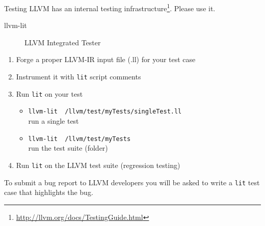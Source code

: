 \begin{frame}{Testing}
LLVM has an internal testing infrastructure\footnote{\url{http://llvm.org/docs/TestingGuide.html}}.
Please use it.
\\
\begin{description}
	\item[llvm-lit] LLVM Integrated Tester
\end{description}
\begin{enumerate}
	\item Forge a proper LLVM-IR input file (.ll) for your test case
	\item Instrument it with \texttt{lit} script comments
	\item Run \texttt{lit} on your test
		\begin{itemize}
			\item \texttt{llvm-lit ~/llvm/test/myTests/singleTest.ll}\\ run a single test
			\item \texttt{llvm-lit ~/llvm/test/myTests}\\ run the test suite (folder)
		\end{itemize}
	\item Run \texttt{lit} on the LLVM test suite (regression testing)
\end{enumerate}
\vfill
To submit a bug report to LLVM developers you will be asked to write a \texttt{lit} test case that highlights the bug.
\end{frame}
